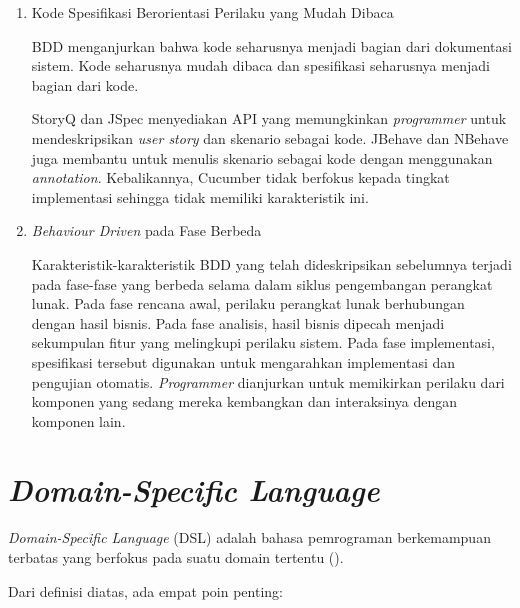 \begin{enumerate}
      \item Kode Spesifikasi Berorientasi Perilaku yang Mudah Dibaca

            BDD menganjurkan bahwa kode seharusnya menjadi bagian dari dokumentasi sistem. Kode seharusnya
            mudah dibaca dan spesifikasi seharusnya menjadi bagian dari kode.

            StoryQ dan JSpec menyediakan API yang memungkinkan \emph{programmer} untuk mendeskripsikan
            \emph{user story} dan skenario sebagai kode. JBehave dan NBehave juga membantu untuk menulis
            skenario sebagai kode dengan menggunakan \emph{annotation}. Kebalikannya, Cucumber tidak
            berfokus kepada tingkat implementasi sehingga tidak memiliki karakteristik ini.

      \item \emph{Behaviour Driven} pada Fase Berbeda

            Karakteristik-karakteristik BDD yang telah dideskripsikan sebelumnya terjadi
            pada fase-fase yang berbeda selama dalam siklus pengembangan perangkat lunak.
            Pada fase rencana awal, perilaku perangkat lunak berhubungan dengan hasil bisnis.
            Pada fase analisis, hasil bisnis dipecah menjadi sekumpulan fitur yang melingkupi
            perilaku sistem.
            Pada fase implementasi, spesifikasi tersebut digunakan untuk mengarahkan implementasi
            dan pengujian otomatis. \emph{Programmer} dianjurkan untuk memikirkan perilaku dari
            komponen yang sedang mereka kembangkan dan interaksinya dengan komponen lain.

\end{enumerate}




\section{\emph{Domain-Specific Language}}

\emph{Domain-Specific Language} (DSL) adalah bahasa pemrograman berkemampuan terbatas yang
berfokus pada suatu domain tertentu (\cite{fowler_dsl}).

Dari definisi diatas, ada empat poin penting:

